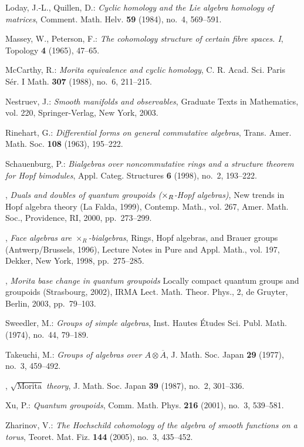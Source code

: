 \documentclass[reqno, a4paper, 10pt]{amsart}
\numberwithin{equation}{section}
\theoremstyle{plain}
\theoremstyle{definition}
\theoremstyle{remark}
\begin{document}
\begin{thebibliography}{10}
Loday, J.-L., Quillen, D.: \emph{Cyclic homology and the {L}ie
  algebra homology of matrices}, Comment. Math. Helv. \textbf{59} (1984),
  no.~4, 569--591.

Massey, W., Peterson, F.: \emph{The cohomology structure of
  certain fibre spaces. {I}}, Topology \textbf{4} (1965), 47--65.

McCarthy, R.: \emph{Morita equivalence and cyclic homology}, C. R. Acad. Sci.
  Paris S\'er. I Math. \textbf{307} (1988), no.~6, 211--215.

Nestruev, J.: \emph{Smooth manifolds and observables}, Graduate Texts in
  Mathematics, vol. 220, Springer-Verlag, New York, 2003.

Rinehart, G.: \emph{Differential forms on general commutative algebras},
  Trans. Amer. Math. Soc. \textbf{108} (1963), 195--222.

Schauenburg, P.: \emph{Bialgebras over noncommutative rings and a structure
  theorem for {H}opf bimodules}, Appl. Categ. Structures \textbf{6} (1998),
  no.~2, 193--222.

\bysame, \emph{Duals and doubles of quantum groupoids ({$\times\sb
  R$}-{H}opf algebras)}, New trends in Hopf algebra theory (La Falda, 1999),
  Contemp. Math., vol. 267, Amer. Math. Soc., Providence, RI, 2000,
  pp.~273--299.

\bysame, \emph{Face algebras are {$\times_R$}-bialgebras}, Rings,
  {H}opf algebras, and {B}rauer groups ({A}ntwerp/{B}russels, 1996), Lecture
  Notes in Pure and Appl. Math., vol. 197, Dekker, New York, 1998,
  pp.~275--285.

\bysame, \emph{Morita base change in  quantum groupoids}
Locally compact quantum groups and groupoids (Strasbourg, 2002), IRMA Lect. Math. Theor. Phys., 2, de Gruyter, Berlin, 2003, pp.~79--103.

Sweedler, M.: \emph{Groups of simple algebras}, Inst. Hautes \'Etudes Sci. Publ.
  Math. (1974), no.~44, 79--189.

Takeuchi, M.: \emph{Groups of algebras over {$A\otimes \overline A$}}, J.
  Math. Soc. Japan \textbf{29} (1977), no.~3, 459--492.

\bysame, \emph{$\sqrt{\mbox{Morita}}$ theory}, J.
  Math. Soc. Japan \textbf{39} (1987), no.~2, 301--336.

Xu, P.: 
\emph{Quantum groupoids}, Comm. Math. Phys. \textbf{216} (2001),
  no.~3, 539--581.

Zharinov, V.: \emph{The {H}ochschild cohomology of the algebra of smooth
  functions on a torus}, Teoret. Mat. Fiz. \textbf{144} (2005), no.~3,
  435--452.

\end{thebibliography}
\end{document}
